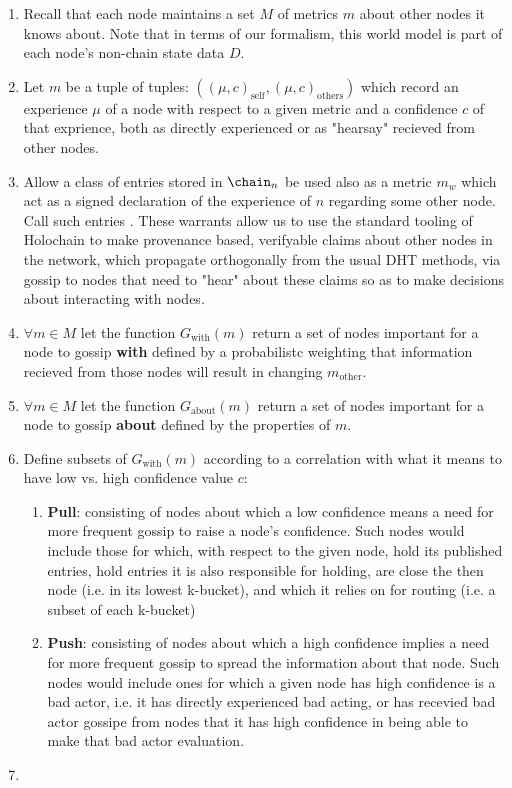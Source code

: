 \documentclass[twocolumn,showpacs,
  nofootinbib,aps,superscriptaddress,
  eqsecnum,prd,notitlepage,showkeys,10pt]{revtex4-1}
\begin{document}
\begin{enumerate}
\item Recall that each node maintains a set $M$ of metrics $m$ about other nodes it knows about. Note that in terms of our formalism, this world model is part of each node's non-chain state data $D$.
\item Let $m$ be a tuple of tuples: $((\mu,c)_\text{self},(\mu,c)_\text{others})$ which record an experience $\mu$ of a node with respect to a given metric and a confidence $c$ of that exprience, both as directly experienced or as "hearsay" recieved from other nodes.
\item Allow a class of entries stored in $\chain_n$ be used also as a metric $m_w$ which act as a signed declaration of the experience of $n$ regarding some other node.  Call such entries .  These warrants allow us to use the standard tooling of Holochain to make provenance based, verifyable claims about other nodes in the network, which propagate orthogonally from the usual DHT methods, via gossip to nodes that need to "hear" about these claims so as to make decisions about interacting with nodes.
\item $\forall m \in M$ let the function $G_\text{with}(m)$ return a set of nodes important for a node to gossip \textbf{with} defined by a probabilistc weighting that information recieved from those nodes will result in changing $m_\text{other}$.
\item $\forall m \in M$ let the function $G_\text{about}(m)$ return a set of nodes important for a node to gossip \textbf{about} defined by the properties of $m$.
\item Define subsets of $G_\text{with}(m)$ according to a correlation with what it means to have low vs. high confidence value $c$:
\begin{enumerate}
\item \textbf{Pull}: consisting of nodes about which a low confidence means a need for more frequent gossip to raise a node's confidence.  Such nodes would include those for which, with respect to the given node, hold its published entries, hold entries it is also responsible for holding, are close the then node (i.e. in its lowest k-bucket), and which it relies on for routing (i.e. a subset of each k-bucket)
\item \textbf{Push}: consisting of nodes about which a high confidence implies a need for more frequent gossip to spread the information about that node.  Such nodes would include ones for which a given node has high confidence is a bad actor, i.e. it has directly experienced bad acting, or has recevied bad actor gossipe from nodes that it has high confidence in being able to make that bad actor evaluation.
\end{enumerate}
\item {}
\end{enumerate}
\end{document}
